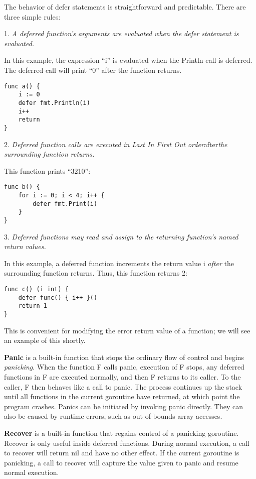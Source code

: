 The behavior of defer statements is straightforward and predictable.
There are three simple rules:

1. \emph{A deferred function's arguments are evaluated when the defer
statement is evaluated.}

In this example, the expression ``i'' is evaluated when the Println call
is deferred. The deferred call will print ``0'' after the function
returns.

\begin{Verbatim}[frame=single]
func a() {
    i := 0
    defer fmt.Println(i)
    i++
    return
}
\end{Verbatim}

2. \emph{Deferred function calls are executed in Last In First Out
order}after\emph{the surrounding function returns.}

This function prints ``3210'':

\begin{Verbatim}[frame=single]
func b() {
    for i := 0; i < 4; i++ {
        defer fmt.Print(i)
    }
}
\end{Verbatim}

3. \emph{Deferred functions may read and assign to the returning
function's named return values.}

In this example, a deferred function increments the return value i
\emph{after} the surrounding function returns. Thus, this function
returns 2:

\begin{Verbatim}[frame=single]
func c() (i int) {
    defer func() { i++ }()
    return 1
}
\end{Verbatim}

This is convenient for modifying the error return value of a function;
we will see an example of this shortly.

\textbf{Panic} is a built-in function that stops the ordinary flow of
control and begins \emph{panicking}. When the function F calls panic,
execution of F stops, any deferred functions in F are executed normally,
and then F returns to its caller. To the caller, F then behaves like a
call to panic. The process continues up the stack until all functions in
the current goroutine have returned, at which point the program crashes.
Panics can be initiated by invoking panic directly. They can also be
caused by runtime errors, such as out-of-bounds array accesses.

\textbf{Recover} is a built-in function that regains control of a
panicking goroutine. Recover is only useful inside deferred functions.
During normal execution, a call to recover will return nil and have no
other effect. If the current goroutine is panicking, a call to recover
will capture the value given to panic and resume normal execution.

